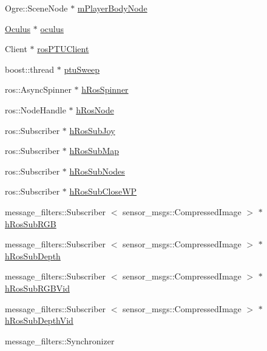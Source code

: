 \begin{DoxyCompactItemize}
\item 
\-Ogre\-::\-Scene\-Node $\ast$ \hyperlink{classBaseApplication_a8c690de5ec96338aa911ae113115da66}{m\-Player\-Body\-Node}
\item 
\hyperlink{classOculus}{\-Oculus} $\ast$ \hyperlink{classBaseApplication_a2edad3c6709f1ff6af45350308a62c8f}{oculus}
\item 
\-Client $\ast$ \hyperlink{classBaseApplication_a2a8d2bd4faf3c20800191f8dd0525983}{ros\-P\-T\-U\-Client}
\item 
boost\-::thread $\ast$ \hyperlink{classBaseApplication_ac9c68350fd4e5888c3256a77db02278e}{ptu\-Sweep}
\item 
ros\-::\-Async\-Spinner $\ast$ \hyperlink{classBaseApplication_abbd36e6d2077310432b8c4f33df7383a}{h\-Ros\-Spinner}
\item 
ros\-::\-Node\-Handle $\ast$ \hyperlink{classBaseApplication_a35b356ea9b074e3f5f1e0b5e66800194}{h\-Ros\-Node}
\item 
ros\-::\-Subscriber $\ast$ \hyperlink{classBaseApplication_ad5628cfeba6fec0ad0cc5b7df4bdbf78}{h\-Ros\-Sub\-Joy}
\item 
ros\-::\-Subscriber $\ast$ \hyperlink{classBaseApplication_a29e8c4acc87f2e63a6d8d360468b56a6}{h\-Ros\-Sub\-Map}
\item 
ros\-::\-Subscriber $\ast$ \hyperlink{classBaseApplication_a92ef2e57f67f525b9910151619f92f37}{h\-Ros\-Sub\-Nodes}
\item 
ros\-::\-Subscriber $\ast$ \hyperlink{classBaseApplication_a244ec7daa7f9247b9121a742b302905c}{h\-Ros\-Sub\-Close\-W\-P}
\item 
message\-\_\-filters\-::\-Subscriber\*
$<$ sensor\-\_\-msgs\-::\-Compressed\-Image $>$ $\ast$ \hyperlink{classBaseApplication_a6ca1659d73ae918a940dcf0e360f1628}{h\-Ros\-Sub\-R\-G\-B}
\item 
message\-\_\-filters\-::\-Subscriber\*
$<$ sensor\-\_\-msgs\-::\-Compressed\-Image $>$ $\ast$ \hyperlink{classBaseApplication_a4a3265b7368e09d95ebaeab383a3d4a5}{h\-Ros\-Sub\-Depth}
\item 
message\-\_\-filters\-::\-Subscriber\*
$<$ sensor\-\_\-msgs\-::\-Compressed\-Image $>$ $\ast$ \hyperlink{classBaseApplication_af475693cdd420f8f8e18269f242fc0af}{h\-Ros\-Sub\-R\-G\-B\-Vid}
\item 
message\-\_\-filters\-::\-Subscriber\*
$<$ sensor\-\_\-msgs\-::\-Compressed\-Image $>$ $\ast$ \hyperlink{classBaseApplication_aa867681d76ee90600daaa741dbdc146d}{h\-Ros\-Sub\-Depth\-Vid}
\item 
message\-\_\-filters\-::\-Synchronizer\*

\end{DoxyCompactItemize}
